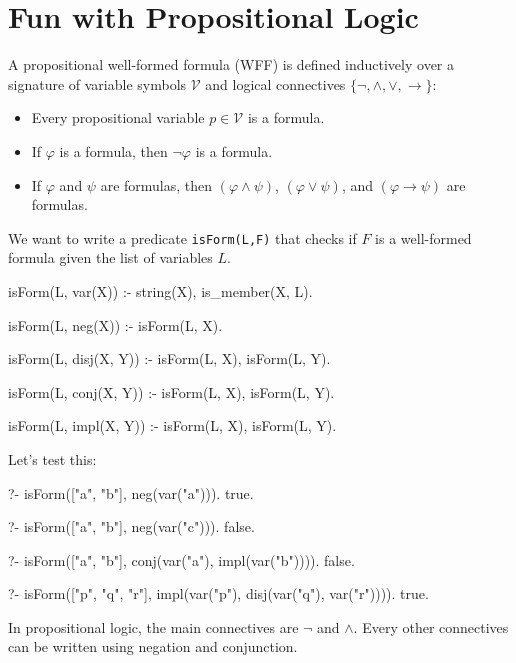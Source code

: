 \section{Fun with Propositional Logic}

A propositional well-formed formula (WFF) is defined inductively over a signature of variable symbols $\mathcal{V}$ and logical connectives $\{\neg, \wedge, \vee, \to\}$:
\begin{itemize}
    \item Every propositional variable $p \in \mathcal{V}$ is a formula.
    \item If $\varphi$ is a formula, then $\neg \varphi$ is a formula.
    \item If $\varphi$ and $\psi$ are formulas, then $(\varphi \wedge \psi)$, $(\varphi \vee \psi)$, and $(\varphi \to \psi)$ are formulas.
\end{itemize}

We want to write a predicate \texttt{isForm(L,F)} that checks if $F$ is a well-formed formula given the list of variables $L$.

\begin{codeblock}
isForm(L, var(X)) :- 
    string(X), 
    is_member(X, L).

isForm(L, neg(X)) :- 
    isForm(L, X).

isForm(L, disj(X, Y)) :- 
    isForm(L, X), 
    isForm(L, Y).

isForm(L, conj(X, Y)) :- 
    isForm(L, X), 
    isForm(L, Y).

isForm(L, impl(X, Y)) :- 
    isForm(L, X), 
    isForm(L, Y).
\end{codeblock}

Let's test this:

\begin{codeblock}
?- isForm(["a", "b"], neg(var("a"))).
true.

?- isForm(["a", "b"], neg(var("c"))).
false.

?- isForm(["a", "b"], conj(var("a"), impl(var("b")))).
false.

?- isForm(["p", "q", "r"], impl(var("p"), disj(var("q"), var("r")))).
true.
\end{codeblock}

In propositional logic, the main connectives are $\neg$ and $\land$. Every other connectives can be written using negation and conjunction.

